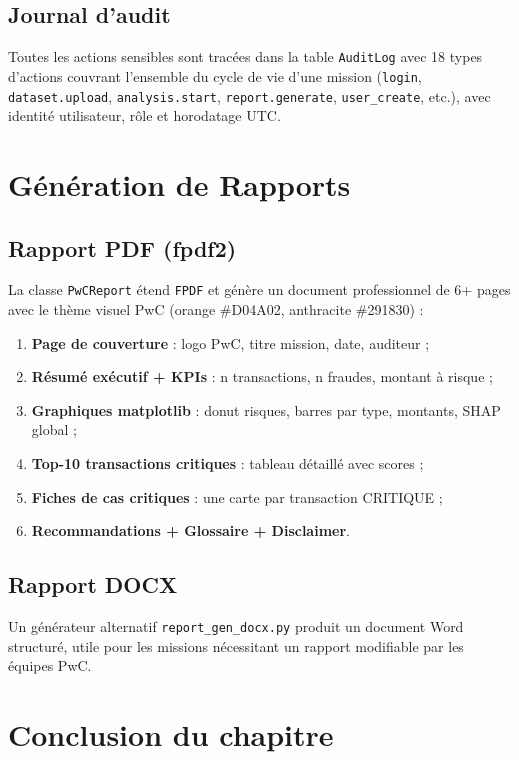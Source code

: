 \documentclass[12pt,a4paper,twoside]{report}
\theoremstyle{definition}
\begin{document}
\subsection{Journal d'audit}

Toutes les actions sensibles sont tracées dans la table \texttt{AuditLog} avec
18 types d'actions couvrant l'ensemble du cycle de vie d'une mission
(\texttt{login}, \texttt{dataset.upload}, \texttt{analysis.start},
\texttt{report.generate}, \texttt{user\_create}, etc.),
avec identité utilisateur, rôle et horodatage UTC.

\section{Génération de Rapports}

\subsection{Rapport PDF (fpdf2)}

La classe \texttt{PwCReport} étend \texttt{FPDF} et génère un document professionnel
de 6+ pages avec le thème visuel PwC (orange \#D04A02, anthracite \#291830) :

\begin{enumerate}
  \item \textbf{Page de couverture} : logo PwC, titre mission, date, auditeur ;
  \item \textbf{Résumé exécutif + KPIs} : n transactions, n fraudes, montant à risque ;
  \item \textbf{Graphiques matplotlib} : donut risques, barres par type, montants,
    SHAP global ;
  \item \textbf{Top-10 transactions critiques} : tableau détaillé avec scores ;
  \item \textbf{Fiches de cas critiques} : une carte par transaction CRITIQUE ;
  \item \textbf{Recommandations + Glossaire + Disclaimer}.
\end{enumerate}

\subsection{Rapport DOCX}

Un générateur alternatif \texttt{report\_gen\_docx.py} produit un document Word
structuré, utile pour les missions nécessitant un rapport modifiable par
les équipes PwC.

\section{Conclusion du chapitre}
\end{document}
